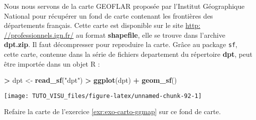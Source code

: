 \documentclass[]{article}
\newenvironment{Shaded}{\begin{snugshade}}{\end{snugshade}}
\newcommand{\DataTypeTok}[1]{\textcolor[rgb]{0.13,0.29,0.53}{#1}}
\newcommand{\DecValTok}[1]{\textcolor[rgb]{0.00,0.00,0.81}{#1}}
\newcommand{\ErrorTok}[1]{\textcolor[rgb]{0.64,0.00,0.00}{\textbf{#1}}}
\newcommand{\KeywordTok}[1]{\textcolor[rgb]{0.13,0.29,0.53}{\textbf{#1}}}
\newcommand{\NormalTok}[1]{#1}
\newcommand{\OperatorTok}[1]{\textcolor[rgb]{0.81,0.36,0.00}{\textbf{#1}}}
\newcommand{\StringTok}[1]{\textcolor[rgb]{0.31,0.60,0.02}{#1}}
\theoremstyle{definition}
\theoremstyle{definition}
\theoremstyle{definition}
\theoremstyle{remark}
\let\BeginKnitrBlock\begin \let\EndKnitrBlock\end
\begin{document}
\BeginKnitrBlock{exercise}[Première carte avec sf]
\protect\hypertarget{exr:exo-carto-sf1}{}{\label{exr:exo-carto-sf1} \iffalse (Première carte avec sf) \fi{} }
\EndKnitrBlock{exercise}

Nous nous servons de la carte GEOFLAR proposée par l'Institut Géographique National pour récupérer un fond de carte contenant les frontières des départements français. Cette carte est disponible sur le site \href{http:\%20//professionnels.ign.fr/}{http: //professionnels.ign.fr/} au format \textbf{shapefile}, elle se trouve dans l'archive \textbf{dpt.zip}. Il faut décompresser pour reproduire la carte. Grâce au package \texttt{sf}, cette carte, contenue dans la série de fichiers departement du répertoire \textbf{dpt}, peut être importée dans un objet R :

\begin{Shaded}
\begin{Highlighting}[]
\OperatorTok{>}\StringTok{ }\NormalTok{dpt <-}\StringTok{ }\KeywordTok{read_sf}\NormalTok{(}\StringTok{"dpt"}\NormalTok{)}
\OperatorTok{>}\StringTok{ }\KeywordTok{ggplot}\NormalTok{(dpt) }\OperatorTok{+}\StringTok{ }\KeywordTok{geom_sf}\NormalTok{()}
\end{Highlighting}
\end{Shaded}

\begin{center}\texttt{[image: TUTO\_VISU\_files/figure-latex/unnamed-chunk-92-1]} \end{center}

Refaire la carte de l'exercice \ref{exr:exo-carto-ggmap} sur ce fond de carte.

\begin{Shaded}
\end{Shaded}
\end{document}
